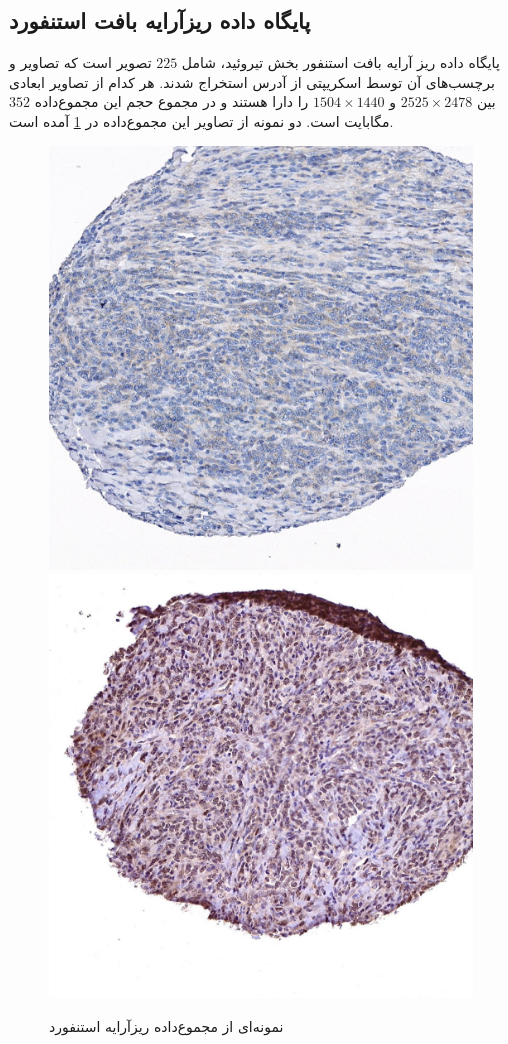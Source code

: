 \subsection{پایگاه داده ریزآرایه بافت استنفورد}\label{subsec:پایگاه-داده-ریزآرایه-بافت-استنفورد}
پایگاه داده ریز آرایه بافت استنفور\cite{marinelli2007stanford} بخش تیروئید، شامل $225$ تصویر است که تصاویر و برچسب‌های آن توسط اسکریپتی از آدرس \cite{stanfortissuemicroarray} استخراج شدند.
هر کدام از تصاویر ابعادی بین
$2525\times2478$
و
$1504\times1440$
را دارا هستند و در مجموع حجم این مجموع‌داده $352$ مگابایت است.
دو نمونه از تصاویر این مجموع‌داده در \ref{stanfordsample} آمده است.
\begin{figure}
	\begin{center}
		\includegraphics[width=0.48\linewidth]{figs/databases/C-TA-88-01.300.cd81_1_88_7_3_300_1469_29.jpeg}
		\includegraphics[width=0.48\linewidth]{figs/databases/C-TA-99-01.125.cyclind2_1_99_9_3_125_1365_31.jpeg}
	\end{center}
	\caption{نمونه‌ای از مجموع‌داده ریزآرایه استنفورد}
	\label{stanfordsample}
\end{figure}
